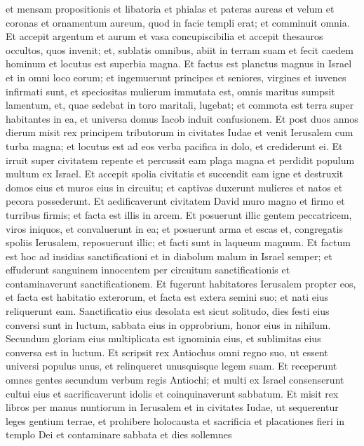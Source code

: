 \begin{biblechapter}
\verse et mensam propositionis et libatoria et phialas et pateras aureas et velum et coronas et ornamentum aureum, quod in facie templi erat; et comminuit omnia.  
\verse Et accepit argentum et aurum et vasa concupiscibilia et accepit thesauros occultos, quos invenit; 
\verse et, sublatis omnibus, abiit in terram suam et fecit caedem hominum et locutus est superbia magna. 
\verse Et factus est planctus magnus in Israel et in omni loco eorum; 
\verse et ingemuerunt principes et seniores, virgines et iuvenes infirmati sunt, et speciositas mulierum immutata est, 
\verse omnis maritus sumpsit lamentum, et, quae sedebat in toro maritali, lugebat; 
\verse et commota est terra super habitantes in ea, et universa domus Iacob induit confusionem. 
\verse Et post duos annos dierum misit rex principem tributorum in civitates Iudae et venit Ierusalem cum turba magna; 
\verse et locutus est ad eos verba pacifica in dolo, et crediderunt ei. Et irruit super civitatem repente et percussit eam plaga magna et perdidit populum multum ex Israel. 
\verse Et accepit spolia civitatis et succendit eam igne et destruxit domos eius et muros eius in circuitu; 
\verse et captivas duxerunt mulieres et natos et pecora possederunt.  
\verse Et aedificaverunt civitatem David muro magno et firmo et turribus firmis; et facta est illis in arcem. 
\verse Et posuerunt illic gentem peccatricem, viros iniquos, et convaluerunt in ea; 
\verse et posuerunt arma et escas et, congregatis spoliis Ierusalem, reposuerunt illic; et facti sunt in laqueum magnum. 
\verse Et factum est hoc ad insidias sanctificationi et in diabolum malum in Israel semper; 
\verse et effuderunt sanguinem innocentem per circuitum sanctificationis et contaminaverunt sanctificationem. 
\verse Et fugerunt habitatores Ierusalem propter eos, et facta est habitatio exterorum, et facta est extera semini suo; et nati eius reliquerunt eam. 
\verse Sanctificatio eius desolata est sicut solitudo, dies festi eius conversi sunt in luctum, sabbata eius in opprobrium, honor eius in nihilum. 
\verse Secundum gloriam eius multiplicata est ignominia eius, et sublimitas eius conversa est in luctum. 
\verse Et scripsit rex Antiochus omni regno suo, ut essent universi populus unus,  
\verse et relinqueret unusquisque legem suam. Et receperunt omnes gentes secundum verbum regis Antiochi; 
\verse et multi ex Israel consenserunt cultui eius et sacrificaverunt idolis et coinquinaverunt sabbatum. 
\verse Et misit rex libros per manus nuntiorum in Ierusalem et in civitates Iudae, ut sequerentur leges gentium terrae, 
\verse et prohibere holocausta et sacrificia et placationes fieri in templo Dei et contaminare sabbata et dies sollemnes 

\end{biblechapter}
